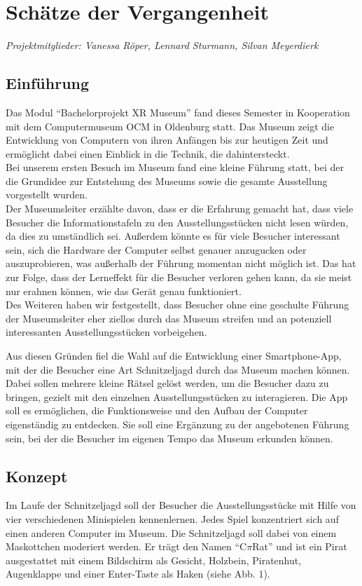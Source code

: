 \chapter{Schätze der Vergangenheit}
\textit{Projektmitglieder: Vanessa Röper, Lennard Sturmann, Silvan Meyerdierk}
\section{Einführung}
Das Modul “Bachelorprojekt XR Museum” fand dieses Semester in Kooperation mit dem Computermuseum OCM in Oldenburg statt. Das Museum zeigt die Entwicklung von Computern von ihren Anfängen bis zur heutigen Zeit und ermöglicht dabei einen Einblick in die Technik, die dahintersteckt.\\
Bei unserem ersten Besuch im Museum fand eine kleine Führung statt, bei der die Grundidee zur Entstehung des Museums sowie die gesamte Ausstellung vorgestellt wurden. \\
\newline
Der Museumsleiter erzählte davon, dass er die Erfahrung gemacht hat, dass viele Besucher die Informationstafeln zu den Ausstellungsstücken nicht lesen würden, da dies zu umständlich sei. Außerdem könnte es für viele Besucher interessant sein, sich die Hardware der Computer selbst genauer anzugucken oder auszuprobieren, was außerhalb der Führung momentan nicht möglich ist. Das hat zur Folge, dass der Lerneffekt für die Besucher verloren gehen kann, da sie meist nur erahnen können, wie das Gerät genau funktioniert.\\
Des Weiteren haben wir festgestellt, dass Besucher ohne eine geschulte Führung der Museumsleiter eher ziellos durch das Museum streifen und an potenziell interessanten Ausstellungsstücken vorbeigehen.\\
\newline

Aus diesen Gründen fiel die Wahl auf die Entwicklung einer Smartphone-App, mit der die Besucher eine Art Schnitzeljagd durch das Museum machen können. Dabei sollen mehrere kleine Rätsel gelöst werden, um die Besucher dazu zu bringen, gezielt mit den einzelnen Ausstellungsstücken zu interagieren. Die App soll es ermöglichen, die Funktionsweise und den Aufbau der Computer eigenständig zu entdecken. Sie soll eine Ergänzung zu der angebotenen Führung sein, bei der die Besucher im eigenen Tempo das Museum erkunden können.

\section{Konzept}
Im Laufe der Schnitzeljagd soll der Besucher die Ausstellungsstücke mit Hilfe von vier verschiedenen Minispielen kennenlernen. Jedes Spiel konzentriert sich auf einen anderen Computer im Museum. Die Schnitzeljagd soll dabei von einem Maskottchen moderiert werden. Er trägt den Namen “C$\pi$Rat” und ist ein Pirat ausgestattet mit einem Bildschirm als Gesicht, Holzbein, Piratenhut, Augenklappe und einer Enter-Taste als Haken (siehe Abb. 1).

